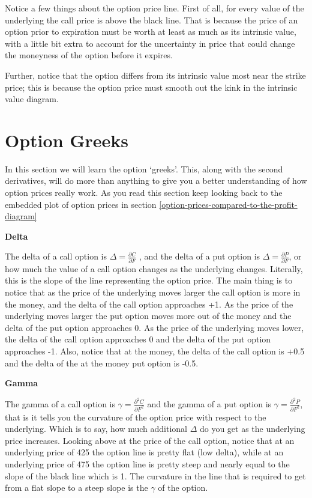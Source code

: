 \documentclass[
]{book}
\begin{document}
Notice a few things about the option price line. First of all, for every value of the underlying the call price is above the black line. That is because the price of an option prior to expiration must be worth at least as much as its intrinsic value, with a little bit extra to account for the uncertainty in price that could change the moneyness of the option before it expires.

Further, notice that the option differs from its intrinsic value most near the strike price; this is because the option price must smooth out the kink in the intrinsic value diagram.

\hypertarget{option-greeks}{%
\section{Option Greeks}\label{option-greeks}}

In this section we will learn the option `greeks'. This, along with the second derivatives, will do more than anything to give you a better understanding of how option prices really work. As you read this section keep looking back to the embedded plot of option prices in section \ref{option-prices-compared-to-the-profit-diagram}

\textbf{Delta}

The delta of a call option is \(\Delta = \frac{\partial C}{\partial F}\) , and the delta of a put option is \(\Delta = \frac{\partial P}{\partial F}\), or how much the value of a call option changes as the underlying changes. Literally, this is the slope of the line representing the option price. The main thing is to notice that as the price of the underlying moves larger the call option is more in the money, and the delta of the call option approaches +1. As the price of the underlying moves larger the put option moves more out of the money and the delta of the put option approaches 0. As the price of the underlying moves lower, the delta of the call option approaches 0 and the delta of the put option approaches -1. Also, notice that at the money, the delta of the call option is +0.5 and the delta of the at the money put option is -0.5.

\textbf{Gamma}

The gamma of a call option is \(\gamma = \frac{\partial^2 C}{\partial F^2}\) and the gamma of a put option is \(\gamma = \frac{\partial^2 P}{\partial F^2}\), that is it tells you the curvature of the option price with respect to the underlying. Which is to say, how much additional \(\Delta\) do you get as the underlying price increases. Looking above at the price of the call option, notice that at an underlying price of 425 the option line is pretty flat (low delta), while at an underlying price of 475 the option line is pretty steep and nearly equal to the slope of the black line which is 1. The curvature in the line that is required to get from a flat slope to a steep slope is the \(\gamma\) of the option.
\end{document}
